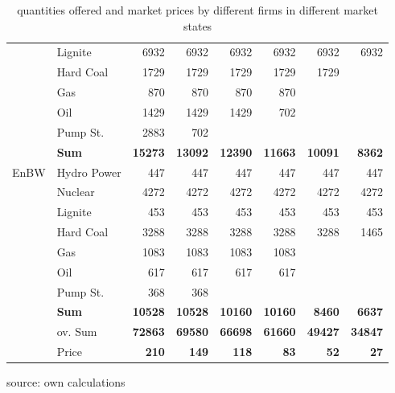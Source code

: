 \begin{table}
\begin{tabular}{llrrrrrr}
           &    Lignite &       6932 &       6932 &       6932 &       6932 &       6932 &       6932 \\

           &  Hard Coal &       1729 &       1729 &       1729 &       1729 &       1729 &            \\

           &        Gas &        870 &        870 &        870 &        870 &            &            \\

           &        Oil &       1429 &       1429 &       1429 &        702 &            &            \\

           &   Pump St. &       2883 &        702 &            &            &            &            \\

           &  {\bf Sum} & {\bf 15273} & {\bf 13092} & {\bf 12390} & {\bf 11663} & {\bf 10091} & {\bf 8362} \\
\hline
      EnBW & Hydro Power &        447 &        447 &        447 &        447 &        447 &        447 \\

           &    Nuclear &       4272 &       4272 &       4272 &       4272 &       4272 &       4272 \\

           &    Lignite &        453 &        453 &        453 &        453 &        453 &        453 \\

           &  Hard Coal &       3288 &       3288 &       3288 &       3288 &       3288 &       1465 \\

           &        Gas &       1083 &       1083 &       1083 &       1083 &            &            \\

           &        Oil &        617 &        617 &        617 &        617 &            &            \\

           &   Pump St. &        368 &        368 &            &            &            &            \\

           &  {\bf Sum} & {\bf 10528} & {\bf 10528} & {\bf 10160} & {\bf 10160} & {\bf 8460} & {\bf 6637} \\
\hline
           &    ov. Sum & {\bf 72863} & {\bf 69580} & {\bf 66698} & {\bf 61660} & {\bf 49427} & {\bf 34847} \\
\hline
           &      Price &  {\bf 210} &  {\bf 149} &  {\bf 118} &   {\bf 83} &   {\bf 52} &   {\bf 27} \\
\hline
\hline
\end{tabular}  

\label{tab:statquant}
\caption{quantities offered and market prices by different firms in different market states}
\begin{center}
source: own calculations
\end{center}
\end{table}

